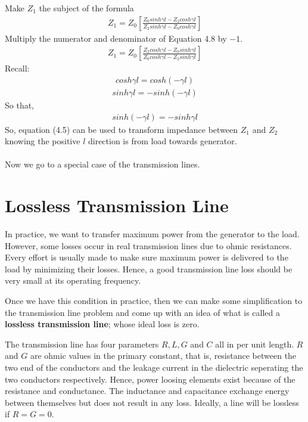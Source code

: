 Make $Z_1$ the subject of the formula
\begin{align}
Z_1 = Z_0[\frac{Z_0sinh\gamma l - Z_2cosh\gamma l}{Z_2sinh\gamma l - Z_0cosh\gamma l}]
\end{align}
Multiply the numerator and denominator of Equation 4.8 by $-1$.
\begin{align*}
Z_1 = Z_0[\frac{Z_2cosh\gamma l - Z_0sinh\gamma l}{Z_0cosh\gamma l - Z_2sinh\gamma l}]
\end{align*}
Recall:
\begin{align*}
cosh\gamma l = cosh(-\gamma l)
\end{align*}
\begin{align*}
sinh\gamma l = -sinh(-\gamma l)
\end{align*}
So that,
\begin{align*}
sinh(-\gamma l) = -sinh\gamma l
\end{align*}
So, equation (4.5) can be used to transform impedance between $Z_1$ and $Z_2$ knowing the positive $l$ direction is from load towards generator.\\\\
Now we go to a special case of the transmission lines.
\section{Lossless Transmission Line}

In practice, we want to transfer maximum power from the generator to the load. However, some losses occur in real transmission lines due to ohmic resistances. Every effort is usually made to make sure maximum power is delivered to the load by minimizing their losses. Hence, a good transmission line loss should be very small at its operating frequency. 

Once we have this condition in practice, then we can make some simplification to the transmission line problem and come up with an idea of what is called a \textbf{lossless transmission line}; whose ideal loss is zero.

The transmission line has four parameters $R, L, G$ and $C$ all in per unit length. $R$ and $G$ are ohmic values in the primary constant, that is, resistance between the two end of the conductors and the leakage current in the dielectric seperating the two conductors respectively. Hence, power loosing elements exist because of the resistance and conductance. The inductance and capacitance exchange energy between themselves but does not result in any loss. Ideally, a line will be lossless if $R = G = 0$.\\

